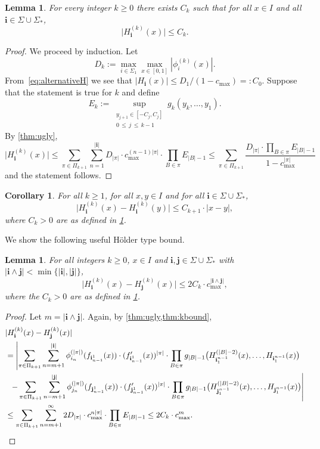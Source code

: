 \documentclass[11pt,a4paper]{article}
\def\cref#1{\ref{#1}}%
\newtheorem{corollary}[theorem]{Corollary}
\newtheorem{lemma}[theorem]{Lemma}
\theoremstyle{definition}
\theoremstyle{remark}
\newcommand{\0}{\mathbf{0}}
\newcommand{\bi}{\mathbf{i}}
\newcommand{\bj}{\mathbf{j}}
\numberwithin{equation}{section}
\begin{document}
\begin{lemma}\label{thm:kbound}
For every integer $k\geq 0$ there exists $C_k$ such that for all $x\in I$ and all
$\bi\in\Sigma\cup\Sigma_*$,
\[
\big|H_{\bi}^{(k)}(x)\big|\leq C_k.
\]
\end{lemma}
\begin{proof}
We proceed by induction. Let
\[
D_k:=\max_{i\in\Sigma_1}\max_{x\in[0,1]} |\phi_i^{(k)}(x)|.
\]
From~\cref{eq:alternativeH} we see that
$|H_{\bi}(x)| \leq D_1/(1-c_{\max})=:C_0$.
Suppose that the statement is true for $k$ and define
\begin{equation}\label{eq:E_k}
E_k:= \sup_{\substack{y_{j+1}\in[-C_j,C_j]\\0\,\leq\, j \,\leq\, k-1}}g_k(y_k,\dots,y_1).
\end{equation}
By \cref{thm:ugly},
\[
\big|H_{\bi}^{(k)}(x)\big| \leq \sum_{\pi\in\Pi_{k+1}}\sum_{n=1}^{|\bi|} D_{|\pi|} \cdot
c_{\max}^{(n-1)|\pi|} \cdot \prod_{B\in\pi}
E_{|B|-1}
\leq \sum_{\pi\in\Pi_{k+1}} \frac{D_{|\pi|}\cdot \prod_{B\in\pi}E_{|B|-1}}{1-c_{\max}^{|\pi|}}
\]
and the statement follows.
\end{proof}
\begin{corollary}
\label{thm:difcor}
For all $k\geq 1$, for all $x,y\in I$ and for all $\bi\in\Sigma\cup\Sigma_*$,
\[
\big|H_{\bi}^{(k)}(x) - H_{\bi}^{(k)}(y)\big| \leq C_{k+1}\cdot |x-y|,
\]
where $C_k>0$ are as defined in \cref{thm:kbound}. 
\end{corollary}
We show the following useful H\"older type bound. 
\begin{lemma}\label{thm:difbound}
For all integers $k\geq 0$, $x\in I$ and $\bi,\bj\in\Sigma\cup\Sigma_*$ with
$|\bi\wedge\bj|<\min\{|\bi|,|\bj|\}$,
\[
\big|H_{\bi}^{(k)}(x) - H_{\bj}^{(k)}(x)\big| \leq 2C_k\cdot c_{\max}^{|\bi\wedge\bj|},
\]
where the $C_k>0$ are as defined in \cref{thm:kbound}. 
\end{lemma}
\begin{proof}
  Let $m = |\bi\wedge\bj|$. Again, by \cref{thm:ugly,thm:kbound},
  \begin{align*}
	&|H_{\bi}^{(k)}(x) - H_{\bj}^{(k)}(x)|
	\\
	&=
	\left|
	\sum_{\pi\in\Pi_{k+1}} \sum_{n=m+1}^{|\bi|} \phi_{i_n}^{(|\pi|)}(f_{\bi_{n-1}^1}(x))\cdot 
	(f'_{\bi_{n-1}^1}(x))^{|\pi|} \cdot
	\prod_{B\in\pi} g_{|B|-1}\big(H_{\bi_1^{n-1}}^{(|B|-2)}(x),\dots,H_{\bi_1^{n-1}}(x)\big)
      \right.
      \\
	&
	\left.\;\; -
	  \sum_{\pi\in\Pi_{k+1}} \sum_{n=m+1}^{|\bj|} \phi_{j_n}^{(|\pi|)}(f_{\bj_{n-1}^1}(x))\cdot
	  (f'_{\bj_{n-1}^1}(x))^{|\pi|} \cdot
	  \prod_{B\in\pi} g_{|B|-1}\big(H_{\bj_1^{n-1}}^{(|B|-2)}(x),\dots,H_{\bj_1^{n-1}}(x)\big)
	  \right|\\
	&\leq
	\sum_{\pi\in\Pi_{k+1}}\sum_{n=m+1}^\infty 2D_{|\pi|}\cdot c_{\max}^{n|\pi|} \cdot
	\prod_{B\in\pi} E_{|B|-1}
	\leq 2 C_{k}\cdot c_{\max}^m.
	\qedhere
  \end{align*}
\end{proof}
\end{document}
